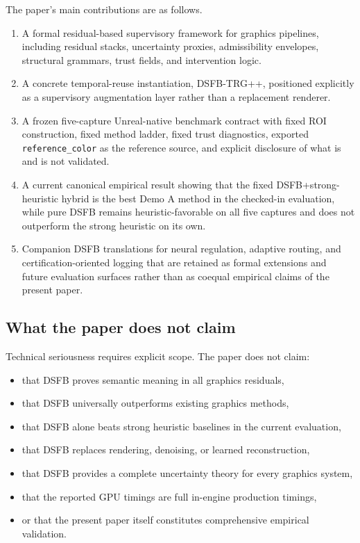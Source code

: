 \documentclass[11pt,letterpaper]{article}
\theoremstyle{gcresult}
\theoremstyle{definition}
\begin{document}
The paper’s main contributions are as follows.

\begin{enumerate}[leftmargin=1.5em]
    \item A formal residual-based supervisory framework for graphics pipelines, including residual stacks, uncertainty proxies, admissibility envelopes, structural grammars, trust fields, and intervention logic.
    \item A concrete temporal-reuse instantiation, DSFB-TRG++, positioned explicitly as a supervisory augmentation layer rather than a replacement renderer.
    \item A frozen five-capture Unreal-native benchmark contract with fixed ROI construction, fixed method ladder, fixed trust diagnostics, exported \texttt{reference\_color} as the reference source, and explicit disclosure of what is and is not validated.
    \item A current canonical empirical result showing that the fixed DSFB+strong-heuristic hybrid is the best Demo A method in the checked-in evaluation, while pure DSFB remains heuristic-favorable on all five captures and does not outperform the strong heuristic on its own.
    \item Companion DSFB translations for neural regulation, adaptive routing, and certification-oriented logging that are retained as formal extensions and future evaluation surfaces rather than as coequal empirical claims of the present paper.
\end{enumerate}


\subsection{What the paper does not claim}

Technical seriousness requires explicit scope. The paper does not claim:
\begin{itemize}[leftmargin=1.5em]
    \item that DSFB proves semantic meaning in all graphics residuals,
    \item that DSFB universally outperforms existing graphics methods,
    \item that DSFB alone beats strong heuristic baselines in the current evaluation,
    \item that DSFB replaces rendering, denoising, or learned reconstruction,
    \item that DSFB provides a complete uncertainty theory for every graphics system,
    \item that the reported GPU timings are full in-engine production timings,
    \item or that the present paper itself constitutes comprehensive empirical validation.
\end{itemize}
\end{document}
